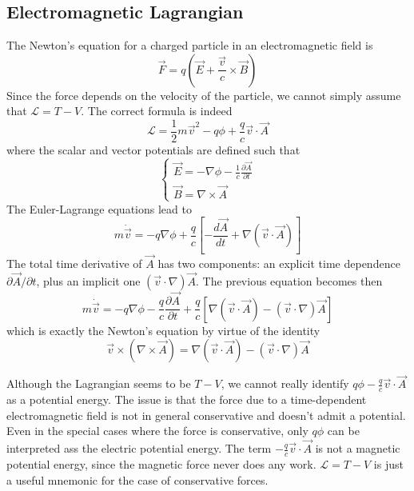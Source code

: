 \documentclass[11pt,fleqn]{book} %
\begin{document}
\subsection{Electromagnetic Lagrangian}
The Newton's equation for a charged particle in an electromagnetic field is
\begin{equation*}
    \vec{F} = q\left(\vec E + \frac{\vec{v}}{c}\times\vec{B}\right)
\end{equation*}
Since the force depends on the velocity of the particle, we cannot simply assume that $\mathcal{L}=T-V$. The correct formula is indeed
\begin{equation}
    \label{eq:em_L}
    \mathcal{L} = \frac{1}{2}m\vec{v}^2-q\phi+\frac{q}{c}\vec{v}\cdot\vec{A}
\end{equation}
where the scalar and vector potentials are defined such that
\begin{equation*}
    \left\{\begin{array}{l}
        \vec{E} = -\nabla\phi-\frac{1}{c}\frac{\partial\vec{A}}{\partial t} \\
        \vec{B} = \nabla\times\vec{A}
    \end{array} \right.
\end{equation*}
The Euler-Lagrange equations lead to
\begin{equation*}
    m\dot{\vec{v}} = -q\nabla\phi+\frac{q}{c}\left[-\frac{d\vec A}{dt}+\nabla(\vec{v}\cdot\vec{A})\right]
\end{equation*}
The total time derivative of $\vec{A}$ has two components: an explicit time dependence $\partial\vec{A}/\partial t$, plus an implicit one
$(\vec{v}\cdot\nabla)\vec{A}$. The previous equation becomes then
\begin{equation*}
    m\dot{\vec{v}} = -q\nabla\phi-\frac{q}{c}\frac{\partial\vec{A}}{\partial t} + 
    \frac{q}{c}\left[\nabla(\vec{v}\cdot\vec{A})-(\vec{v}\cdot\nabla)\vec{A}\right]
\end{equation*}
which is exactly the Newton's equation by virtue of the identity
\begin{equation*}
    \vec{v}\times(\nabla\times\vec{A})=\nabla(\vec{v}\cdot\vec{A})-(\vec{v}\cdot\nabla)\vec{A}
\end{equation*}

\begin{remark}
    Although the Lagrangian seems to be $T-V$, we cannot really identify $q\phi-\frac{q}{c}\vec{v}\cdot\vec{A}$ as a potential energy. The issue is 
    that the force due to a time-dependent electromagnetic field is not in general conservative and doesn't admit a potential. Even in the special 
    cases where the force is conservative, only $q\phi$ can be interpreted ass the electric potential energy. The term $-\frac{q}{c}\vec{v}\cdot\vec{A}$ is
    not a magnetic potential energy, since the magnetic force never does any work. $\mathcal{L}=T-V$ is just a useful mnemonic for the case of
    conservative forces.
\end{remark}
\end{document}

